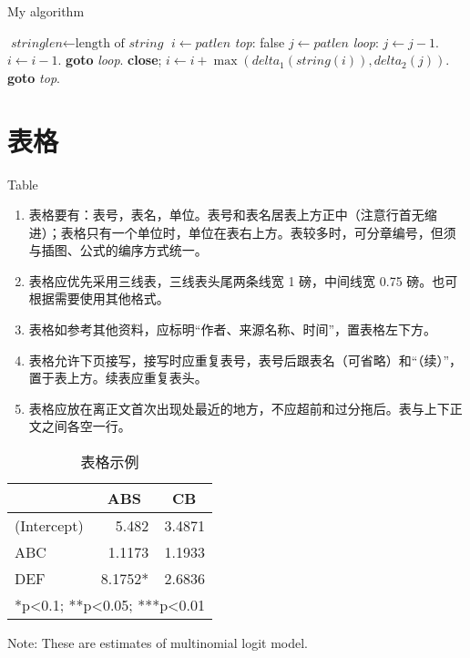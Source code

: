 \begin{algorithm}
	\caption{My algorithm}\label{euclid}
	\begin{algorithmic}[1]
		\State $\textit{stringlen} \gets \text{length of }\textit{string}$
		\State $i \gets \textit{patlen}$
		\BState \emph{top}:
		 \Return false
		\EndIf
		\State $j \gets \textit{patlen}$
		\BState \emph{loop}:
		\State $j \gets j-1$.
		\State $i \gets i-1$.
		\State \textbf{goto} \emph{loop}.
		\State \textbf{close};
		\EndIf
		\State $i \gets i+\max(\textit{delta}_1(\textit{string}(i)),\textit{delta}_2(j))$.
		\State \textbf{goto} \emph{top}.
		\EndProcedure
	\end{algorithmic}
\end{algorithm}


\section{表格}{Table}

\begin{enumerate}
	\item 表格要有：表号，表名，单位。表号和表名居表上方正中（注意行首无缩进）；表格只有一个单位时，单位在表右上方。表较多时，可分章编号，但须与插图、公式的编序方式统一。
	\item 表格应优先采用三线表，三线表头尾两条线宽 1 磅，中间线宽 0.75 磅。也可根据需要使用其他格式。
	\item 表格如参考其他资料，应标明“作者、来源名称、时间”，置表格左下方。
	\item 表格允许下页接写，接写时应重复表号，表号后跟表名（可省略）和“（续）”，置于表上方。续表应重复表头。
	\item 表格应放在离正文首次出现处最近的地方，不应超前和过分拖后。表与上下正文之间各空一行。
\end{enumerate}



\begin{table}[h!]
			\centering
	\begin{threeparttable}[b]
		\footnotesize
		\caption{表格示例}
		\begin{tabular}{lrr}
			\toprule
			& \multicolumn{1}{c}{ABS} & \multicolumn{1}{c}{CB} \\
			\midrule
			(Intercept) & 5.482 & 3.4871 \\
			ABC & 1.1173 & 1.1933 \\
			DEF & 8.1752* & 2.6836 \\
			\bottomrule
			\multicolumn{3}{c}{*p<0.1; **p<0.05; ***p<0.01} \\
			\bottomrule
		\end{tabular}%
		\label{tab:mlogit}%
		\begin{tablenotes}
			\footnotesize
			Note: These are estimates of multinomial logit model.
		\end{tablenotes}
	\end{threeparttable}
\end{table}%

